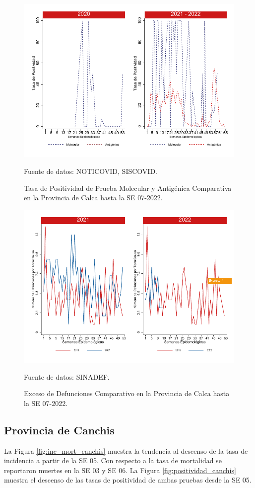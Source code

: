 \documentclass[12pt,a4paper,openany]{book}
\begin{document}
		\begin{figure}[h]
			\caption{Tasa de Positividad de Prueba Molecular y Antigénica Comparativa en la Provincia de Calca hasta la SE 07-2022.}\label{fig:positividad_calca}
			\begin{center}
				\includegraphics[width=0.7\linewidth]{../figuras/positividad_20_21_4.pdf}
			\end{center}
			{\footnotesize {Fuente de datos: NOTICOVID, SISCOVID.}}
		\end{figure}
		
		\begin{figure}[h]
			\caption{Exceso de Defunciones Comparativo en la Provincia de Calca hasta la SE 07-2022.}\label{fig:exceso_calca}
			\begin{center}
				\includegraphics[width=0.7\linewidth]{../figuras/exceso_4.pdf}
			\end{center}
			{\footnotesize {Fuente de datos: SINADEF.}}
		\end{figure}
		
		\clearpage
		
		\subsection*{Provincia de Canchis}
		\noindent La Figura \ref{fig:inc_mort_canchis} muestra la tendencia al descenso de la tasa de incidencia a partir de la SE 05. Con respecto a la tasa de mortalidad se reportaron muertes en la SE 03 y SE 06.    
		\noindent La Figura \ref{fig:positividad_canchis} muestra el descenso de las tasas de positividad de ambas pruebas desde la SE 05.
		
\end{document}

